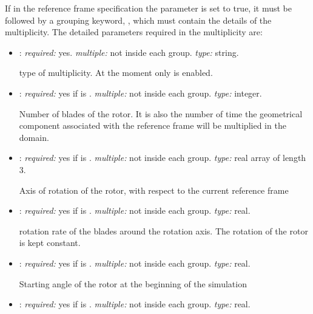 If in the reference frame specification the parameter  
is set to true, it must be followed by a grouping keyword, , 
which must contain the details of the multiplicity. The detailed parameters 
required in the multiplicity are:
\begin{itemize}
    \item {}: \textit{required:} yes. \textit{multiple:} 
    not inside each  group. \textit{type:} string.
    
    type of multiplicity. At the moment only  is enabled.
    
    \item {}: \textit{required:} yes if  
    is . \textit{multiple:} not inside each  group. 
    \textit{type:} integer.
    
    Number of blades of the rotor. It is also the number of time the geometrical 
    component associated with the reference frame will be multiplied in the domain. 
    
    \item {}: \textit{required:} yes if  is . 
    \textit{multiple:} not inside each  group. 
    \textit{type:} real array of length 3.
    
    Axis of rotation of the rotor, with respect to the current reference frame
    
    \item {}: \textit{required:} yes if  is . 
    \textit{multiple:} not inside each  group. \textit{type:} real.
    
    rotation rate of the blades around the rotation axis. 
    The rotation of the rotor is kept constant.
    
    \item {}: \textit{required:} yes if  is . 
    \textit{multiple:} not inside each  group. \textit{type:} real.
    
    Starting angle of the rotor at the beginning of the simulation
    
    \item {}: \textit{required:} yes if  is . 
    \textit{multiple:} not inside each  group. \textit{type:} real. 
    

\end{itemize}
